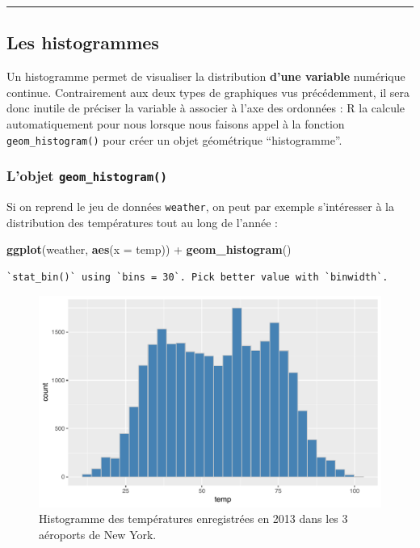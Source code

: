 \documentclass[a4paperpaper,]{article}
\newenvironment{Shaded}{\begin{snugshade}}{\end{snugshade}}
\newcommand{\DataTypeTok}[1]{\textcolor[rgb]{0.00,0.34,0.68}{#1}}
\newcommand{\KeywordTok}[1]{\textcolor[rgb]{0.12,0.11,0.11}{\textbf{#1}}}
\newcommand{\NormalTok}[1]{\textcolor[rgb]{0.12,0.11,0.11}{#1}}
\newcommand{\OperatorTok}[1]{\textcolor[rgb]{0.12,0.11,0.11}{#1}}
\newcommand{\StringTok}[1]{\textcolor[rgb]{0.75,0.01,0.01}{#1}}
\begin{document}
\begin{center}\rule{0.5\linewidth}{\linethickness}\end{center}

\hypertarget{histogram}{%
\subsection{Les histogrammes}\label{histogram}}

Un histogramme permet de visualiser la distribution \textbf{d'une variable} numérique continue. Contrairement aux deux types de graphiques vus précédemment, il sera donc inutile de préciser la variable à associer à l'axe des ordonnées : R la calcule automatiquement pour nous lorsque nous faisons appel à la fonction \texttt{geom\_histogram()} pour créer un objet géométrique ``histogramme''.

\hypertarget{lobjet-geom_histogram}{%
\subsubsection{\texorpdfstring{L'objet \texttt{geom\_histogram()}}{L'objet geom\_histogram()}}\label{lobjet-geom_histogram}}

Si on reprend le jeu de données \texttt{weather}, on peut par exemple s'intéresser à la distribution des températures tout au long de l'année :

\begin{Shaded}
\begin{Highlighting}[]
\KeywordTok{ggplot}\NormalTok{(weather, }\KeywordTok{aes}\NormalTok{(}\DataTypeTok{x =}\NormalTok{ temp)) }\OperatorTok{+}
\StringTok{  }\KeywordTok{geom_histogram}\NormalTok{()}
\end{Highlighting}
\end{Shaded}

\begin{verbatim}
`stat_bin()` using `bins = 30`. Pick better value with `binwidth`.
\end{verbatim}

\begin{figure}[htpb]

{\centering \includegraphics[width=0.9\linewidth]{figure/unnamed-chunk-47-1} 

}

\caption{Histogramme des températures enregistrées en 2013 dans les 3 aéroports de New York.}\label{fig:unnamed-chunk-47}
\end{figure}
\end{document}
